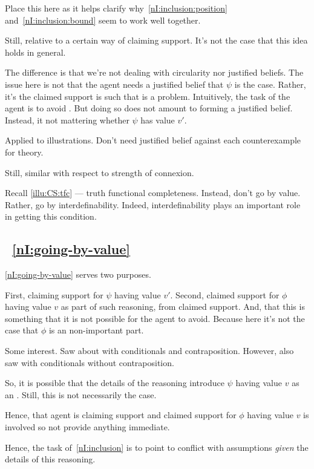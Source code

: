 \begin{note}[Literature]
  {
    \color{red}
    Place this here as it helps clarify why~\ref{nI:inclusion:position} and~\ref{nI:inclusion:bound} seem to work well together.
  }

  Still, relative to a certain way of claiming support.
  It's not the case that this idea holds in general.

  The difference is that we're not dealing with circularity nor justified beliefs.
  The issue here is not that the agent needs a justified belief that \(\psi\) is the case.
  Rather, it's the claimed support is such that \requ{} is a problem.
  Intuitively, the task of the agent is to avoid \requ{}.
  But doing so does not amount to forming a justified belief.
  Instead, it not mattering whether \(\psi\) has value \(v'\).

  Applied to illustrations.
  Don't need justified belief against each counterexample for theory.

  Still, similar with respect to strength of connexion.
\end{note}

\begin{note}
  \color{red}
  Recall \autoref{illu:CS:tfc} --- truth functional completeness.
  Instead, don't go by value.
  Rather, go by interdefinability.
  Indeed, interdefinability plays an important role in getting this condition.
\end{note}

\subsection{~\ref{nI:going-by-value}}

\begin{note}
  \ref{nI:going-by-value} serves two purposes.

  First, claiming support for \(\psi\) having value \(v'\).
  Second, claimed support for \(\phi\) having value \(v\) as part of such reasoning, from claimed support.
  And, that this is something that it is not possible for the agent to avoid.
  {
    \color{red} Because here it's not the case that \(\phi\) is an non-important part.
  }

  Some interest.
  Saw about with conditionals and contraposition.
  However, also saw with conditionals without contraposition.

  So, it is possible that the details of the reasoning introduce \(\psi\) having value \(v\) as an \requ{}.
  Still, this is not necessarily the case.

  Hence, that agent is claiming support and claimed support for \(\phi\) having value \(v\) is involved so not provide anything immediate.

  Hence, the task of~\ref{nI:inclusion} is to point to conflict with assumptions \emph{given} the details of this reasoning.
\end{note}

